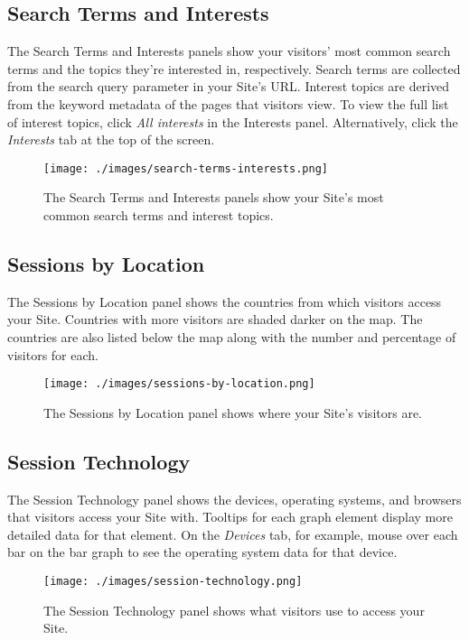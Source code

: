 \subsection{Search Terms and
Interests}\label{search-terms-and-interests}

The Search Terms and Interests panels show your visitors' most common
search terms and the topics they're interested in, respectively. Search
terms are collected from the search query parameter in your Site's URL.
Interest topics are derived from the keyword metadata of the pages that
visitors view. To view the full list of interest topics, click \emph{All
interests} in the Interests panel. Alternatively, click the
\emph{Interests} tab at the top of the screen.

\begin{figure}
\centering
\texttt{[image: ./images/search-terms-interests.png]}
\caption{The Search Terms and Interests panels show your Site's most
common search terms and interest topics.}
\end{figure}

\subsection{Sessions by Location}\label{sessions-by-location}

The Sessions by Location panel shows the countries from which visitors
access your Site. Countries with more visitors are shaded darker on the
map. The countries are also listed below the map along with the number
and percentage of visitors for each.

\begin{figure}
\centering
\texttt{[image: ./images/sessions-by-location.png]}
\caption{The Sessions by Location panel shows where your Site's visitors
are.}
\end{figure}

\subsection{Session Technology}\label{session-technology}

The Session Technology panel shows the devices, operating systems, and
browsers that visitors access your Site with. Tooltips for each graph
element display more detailed data for that element. On the
\emph{Devices} tab, for example, mouse over each bar on the bar graph to
see the operating system data for that device.

\begin{figure}
\centering
\texttt{[image: ./images/session-technology.png]}
\caption{The Session Technology panel shows what visitors use to access
your Site.}
\end{figure}

